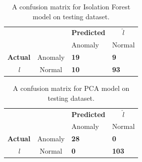\begin{table}[!h]
\centering
\begin{tabular}{cccc}
\multicolumn{1}{r}{}                 &                              & \textbf{Predicted}          &   $\hat{l}$                          \\ \cline{3-4} 
                                     & \multicolumn{1}{l|}{}        & \multicolumn{1}{l|}{Anomaly} & \multicolumn{1}{l|}{Normal} \\ \cline{2-4} 
                                      
\multicolumn{1}{l|}{\textbf{Actual}} & \multicolumn{1}{l|}{Anomaly}  & \multicolumn{1}{l|}{\textcolor{customBlue}{\textbf{19}}}     & \multicolumn{1}{l|}{\textcolor{customRed}{\textbf{9}}}      \\ \cline{2-4} 
\multicolumn{1}{c|}{\textit{l}}                & \multicolumn{1}{c|}{Normal} & \multicolumn{1}{l|}{\textcolor{customDarkRed}{\textbf{10}}}     & \multicolumn{1}{l|}{\textcolor{customGreen}{\textbf{93}}}      \\ \cline{2-4} 
\end{tabular}
\caption{A confusion matrix for Isolation Forest model on testing dataset.}
\label{table:confusionMatrix:if}
\end{table}


\begin{table}[!h]
\centering
\begin{tabular}{cccc}
\multicolumn{1}{r}{}                 &                              & \textbf{Predicted}          &   $\hat{l}$                          \\ \cline{3-4} 
                                     & \multicolumn{1}{l|}{}        & \multicolumn{1}{l|}{Anomaly} & \multicolumn{1}{l|}{Normal} \\ \cline{2-4} 
                                      
\multicolumn{1}{l|}{\textbf{Actual}} & \multicolumn{1}{l|}{Anomaly}  & \multicolumn{1}{l|}{\textcolor{customBlue}{\textbf{28}}}     & \multicolumn{1}{l|}{\textcolor{customRed}{\textbf{0}}}      \\ \cline{2-4} 
\multicolumn{1}{c|}{\textit{l}}                & \multicolumn{1}{c|}{Normal} & \multicolumn{1}{l|}{\textcolor{customDarkRed}{\textbf{0}}}     & \multicolumn{1}{l|}{\textcolor{customGreen}{\textbf{103}}}      \\ \cline{2-4} 
\end{tabular}
\caption{A confusion matrix for PCA model on testing dataset.}
\label{table:confusionMatrix:pca}
\end{table}


